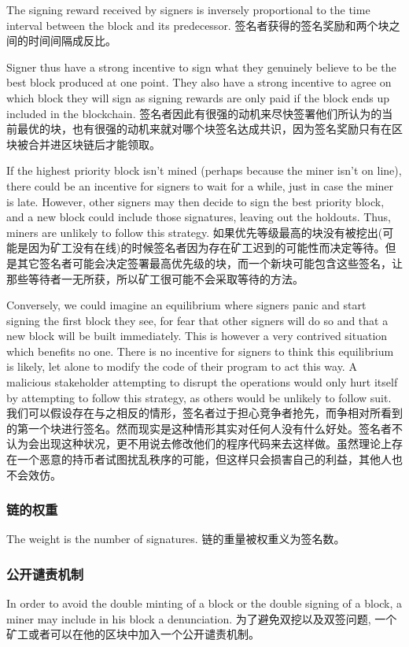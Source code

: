 \documentclass[letterpaper]{article}
\begin{document}
The signing reward received by signers is inversely proportional to the time
interval between the block and its predecessor.
签名者获得的签名奖励和两个块之间的时间间隔成反比。

Signer thus have a strong incentive to sign what they genuinely believe to be
the best block produced at one point. They also have a strong incentive to agree
on which block they will sign as signing rewards are only paid if the block ends
up included in the blockchain.
签名者因此有很强的动机来尽快签署他们所认为的当前最优的块，也有很强的动机来就对哪个块签名达成共识，因为签名奖励只有在区块被合并进区块链后才能领取。

If the highest priority block isn't mined (perhaps because the miner isn't
on line), there could be an incentive for signers to wait for a while, just
in case the miner is late. However, other signers may then decide to sign the
best priority block, and a new block could include those signatures, leaving out
the holdouts. Thus, miners are unlikely to follow this strategy.
如果优先等级最高的块没有被挖出(可能是因为矿工没有在线)的时候签名者因为存在矿工迟到的可能性而决定等待。但是其它签名者可能会决定签署最高优先级的块，而一个新块可能包含这些签名，让那些等待者一无所获，所以矿工很可能不会采取等待的方法。

Conversely, we could imagine an equilibrium where signers panic and start
signing the first block they see, for fear that other signers will do so and
that a new block will be built immediately. This is however a very contrived
situation which benefits no one. There is no incentive for signers to think this
equilibrium is likely, let alone to modify the code of their program to act
this way. A malicious stakeholder attempting to disrupt the operations would only
hurt itself by attempting to follow this strategy, as others would be unlikely
to follow suit.
我们可以假设存在与之相反的情形，签名者过于担心竞争者抢先，而争相对所看到的第一个块进行签名。然而现实是这种情形其实对任何人没有什么好处。签名者不认为会出现这种状况，更不用说去修改他们的程序代码来去这样做。虽然理论上存在一个恶意的持币者试图扰乱秩序的可能，但这样只会损害自己的利益，其他人也不会效仿。

\subsubsection{链的权重}

The weight is the number of signatures.
链的重量被权重义为签名数。

\subsubsection{公开谴责机制}
In order to avoid the double minting of a block or the double signing of a
block, a miner may include in his block a denunciation.
为了避免双挖以及双签问题, 一个矿工或者可以在他的区块中加入一个公开谴责机制。
\end{document}
